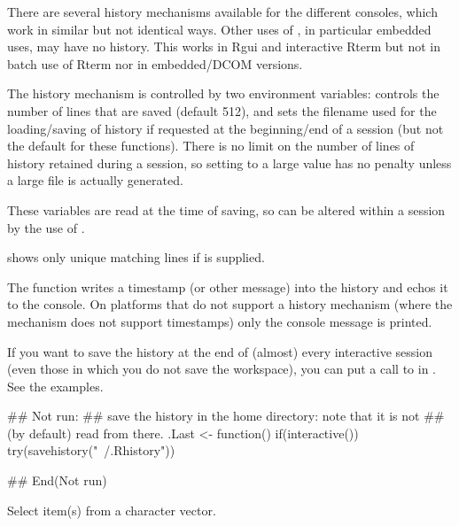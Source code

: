 \begin{Details}\relax
There are several history mechanisms available for the different \R{}
consoles, which work in similar but not identical ways.  Other uses of
\R{}, in particular embedded uses, may have no history.
This works in Rgui and interactive Rterm but not in batch use of Rterm
nor in embedded/DCOM versions.

The history mechanism is controlled by two environment
variables:  controls the number of lines that are
saved (default 512), and  sets the filename used for
the loading/saving of history if requested at the beginning/end of a
session (but not the default for these functions).  There is no limit
on the number of lines of history retained during a session, so
setting  to a large value has no penalty unless a
large file is actually generated.

These variables are read at the time of saving, so can be altered
within a session by the use of .


 shows only unique matching lines if  is
supplied.

The  function writes a timestamp (or other message)
into the history and echos it to the console.  On platforms that do not
support a history mechanism (where the mechanism does not support
timestamps) only the console message is printed.
\end{Details}
%
\begin{Note}\relax
If you want to save the history at the end of (almost) every
interactive session (even those in which you do not save the
workspace), you can put a call to  in
.  See the examples.
\end{Note}
%
\begin{Examples}
\begin{ExampleCode}
## Not run: 
## save the history in the home directory: note that it is not
## (by default) read from there.
.Last <- function()
    if(interactive()) try(savehistory("~/.Rhistory"))

## End(Not run)
\end{ExampleCode}
\end{Examples}
%
\begin{Description}\relax
Select item(s) from a character vector.
\end{Description}
